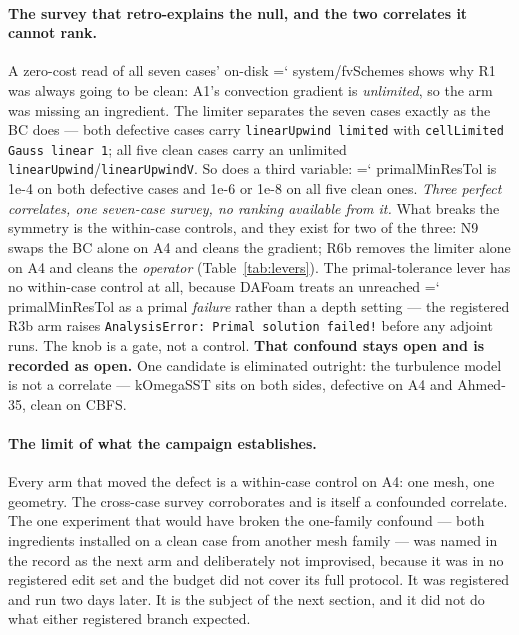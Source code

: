 \documentclass[11pt,a4paper]{article}
\newcommand{\artifact}[1]{{\small\ttfamily\hyphenchar\font=`\-\relax
  \def\_{\textunderscore\allowbreak}#1}}
\begin{document}
\paragraph{The survey that retro-explains the null, and the two correlates it cannot rank.}
A zero-cost read of all seven cases' on-disk \artifact{system/fvSchemes} shows why R1 was
always going to be clean: A1's convection gradient is \emph{unlimited}, so the arm was
missing an ingredient. The limiter separates the seven cases exactly as the BC does --- both
defective cases carry \texttt{linearUpwind limited} with \texttt{cellLimited Gauss linear 1};
all five clean cases carry an unlimited \texttt{linearUpwind}/\texttt{linearUpwindV}. So does
a third variable: \artifact{primalMinResTol} is 1e-4 on both defective cases and 1e-6 or 1e-8
on all five clean ones. \emph{Three perfect correlates, one seven-case survey, no ranking
available from it.} What breaks the symmetry is the within-case controls, and they exist for
two of the three: N9 swaps the BC alone on A4 and cleans the gradient; R6b removes the
limiter alone on A4 and cleans the \emph{operator} (Table~\ref{tab:levers}). The
primal-tolerance lever has no within-case control at all, because DAFoam treats an unreached
\artifact{primalMinResTol} as a primal \emph{failure} rather than a depth setting --- the
registered R3b arm raises \texttt{AnalysisError: Primal solution failed!} before any adjoint
runs. The knob is a gate, not a control. \textbf{That confound stays open and is recorded as
open.} One candidate is eliminated outright: the turbulence model is not a correlate ---
kOmegaSST sits on both sides, defective on A4 and Ahmed-35, clean on CBFS.

\paragraph{The limit of what the campaign establishes.} Every arm that moved the defect is a
within-case control on A4: one mesh, one geometry. The cross-case survey corroborates and is
itself a confounded correlate. The one experiment that would have broken the one-family
confound --- both ingredients installed on a clean case from another mesh family --- was named
in the record as the next arm and deliberately not improvised, because it was in no registered
edit set and the budget did not cover its full protocol. It was registered and run two days
later. It is the subject of the next section, and it did not do what either registered branch
expected.

\end{document}

